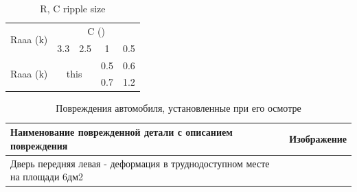 \begin{table}[ph]
	\centering
	\begin{tabular}{c|c|c|c|c}
		\hline
		\multirow{2}{*}{Raaa (k)} & \multicolumn{4}{c}{C ()} \\
		\hhline{~----}
		& 3.3 & 2.5 & 1 & 0.5 \\
		\hline
		\multirow{2}{*}{Raaa (k)} & \multicolumn{2}{c|}{\multirow{2}{*}{this}} & 0.5 & 0.6\\
		\hhline{~~~--}            & \multicolumn{2}{c|}{}                      & 0.7 & 1.2 \\
		\hline
	\end{tabular}
	\caption{R, C ripple size}
	\label{T:peak}
\end{table}

\begin{longtable}{|M{125mm}|M{30mm}|}
	\caption[]{\footnotesize {Повреждения автомобиля, установленные при его осмотре}} \label{tab:5}\\ 
	\hline
\bf {\small Наименование поврежденной детали с описанием повреждения} & \bf {\small Изображение} \\ \hline \endhead
{\small Дверь передняя левая -  деформация в труднодоступном месте на площади 6дм2}&  \\ \hline 

\end{longtable}


